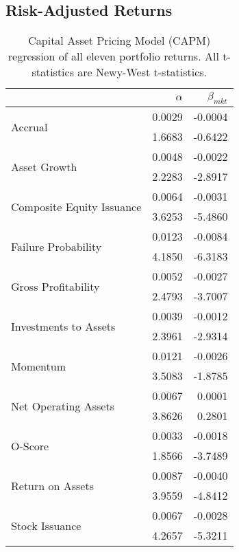 \documentclass[a4paper]{article}                 %
\begin{document}
\subsection{Risk-Adjusted Returns}
\begin{table}[h]
    \scriptsize
    \caption{\newline Capital Asset Pricing Model (CAPM) regression of all eleven portfolio returns. All t-statistics are Newy-West t-statistics.}
    \label{tab:Table 2}
    \begin{tabular}{@{}lrr@{}}
    \toprule
     & $\alpha$ & $\beta_{mkt}$ \\ \midrule
    \multirow{2}{*}{Accrual} & 0.0029 & -0.0004 \\
     & 1.6683 & -0.6422 \\
    \multirow{2}{*}{Asset Growth} & 0.0048 & -0.0022 \\
     & 2.2283 & -2.8917 \\
    \multirow{2}{*}{Composite Equity Issuance} & 0.0064 & -0.0031 \\
     & 3.6253 & -5.4860 \\
    \multirow{2}{*}{Failure Probability} & 0.0123 & -0.0084 \\
     & 4.1850 & -6.3183 \\
    \multirow{2}{*}{Gross Profitability} & 0.0052 & -0.0027 \\
     & 2.4793 & -3.7007 \\
    \multirow{2}{*}{Investments to Assets} & 0.0039 & -0.0012 \\
     & 2.3961 & -2.9314 \\
    \multirow{2}{*}{Momentum} & 0.0121 & -0.0026 \\
     & 3.5083 & -1.8785 \\
    \multirow{2}{*}{Net Operating Assets} & 0.0067 & 0.0001 \\
     & 3.8626 & 0.2801 \\
    \multirow{2}{*}{O-Score} & 0.0033 & -0.0018 \\
     & 1.8566 & -3.7489 \\
    \multirow{2}{*}{Return on Assets} & 0.0087 & -0.0040 \\
     & 3.9559 & -4.8412 \\
    \multirow{2}{*}{Stock Issuance} & 0.0067 & -0.0028 \\
     & 4.2657 & -5.3211 \\ \bottomrule
    \end{tabular}
\end{table}
\end{document}

